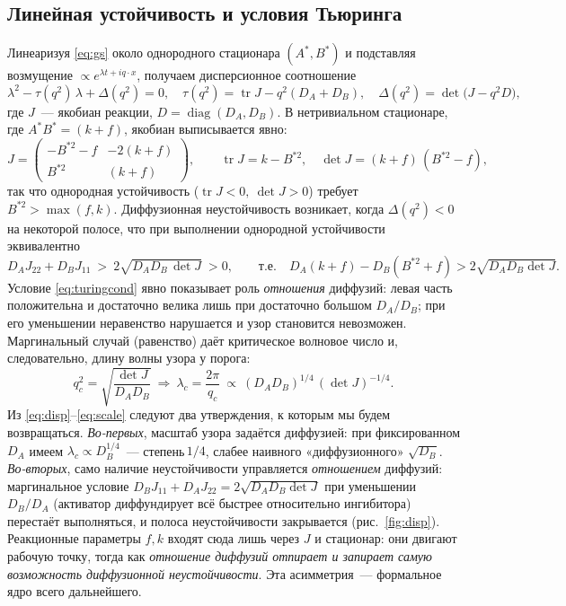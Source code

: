 \documentclass[11pt]{article}
\newcommand{\DA}{D_{\!A}}\newcommand{\DB}{D_{\!B}}
\begin{document}
\subsection{Линейная устойчивость и условия Тьюринга}
Линеаризуя \eqref{eq:gs} около однородного стационара $(A^*,B^*)$ и подставляя возмущение $\propto e^{\lambda t+iq\cdot x}$,
получаем дисперсионное соотношение
\begin{equation}
\lambda^2-\tau(q^2)\,\lambda+\Delta(q^2)=0,\quad
\tau(q^2)=\operatorname{tr}J-q^2(\DA+\DB),\quad
\Delta(q^2)=\det\!\big(J-q^2D\big),
\label{eq:disp}
\end{equation}
где $J$~— якобиан реакции, $D=\operatorname{diag}(\DA,\DB)$. В нетривиальном стационаре, где $A^*B^*=(k+f)$,
якобиан выписывается явно:
\begin{equation}
J=\begin{pmatrix} -B^{*2}-f & -2(k+f)\\[2pt] B^{*2} & (k+f)\end{pmatrix},\qquad
\operatorname{tr}J=k-B^{*2},\quad \det J=(k+f)\,(B^{*2}-f),
\label{eq:jac}
\end{equation}
так что однородная устойчивость ($\operatorname{tr}J<0,\ \det J>0$) требует $B^{*2}>\max(f,k)$. Диффузионная
неустойчивость возникает, когда $\Delta(q^2)<0$ на некоторой полосе, что при выполнении однородной устойчивости
эквивалентно
\begin{equation}
\DA J_{22}+\DB J_{11}\ >\ 2\sqrt{\DA\DB\,\det J}\ >0,
\qquad\text{т.е.}\quad \DA(k+f)-\DB(B^{*2}+f)>2\sqrt{\DA\DB\det J}.
\label{eq:turingcond}
\end{equation}
Условие \eqref{eq:turingcond} явно показывает роль \emph{отношения} диффузий: левая часть положительна и достаточно
велика лишь при достаточно большом $\DA/\DB$; при его уменьшении неравенство нарушается и узор становится
невозможен. Маргинальный случай (равенство) даёт критическое волновое число и, следовательно, длину волны узора у
порога:
\begin{equation}
q_c^2=\sqrt{\frac{\det J}{\DA\DB}}\ \Longrightarrow\
\lambda_c=\frac{2\pi}{q_c}\ \propto\ (\DA\DB)^{1/4}\,(\det J)^{-1/4}.
\label{eq:scale}
\end{equation}
Из \eqref{eq:disp}–\eqref{eq:scale} следуют два утверждения, к которым мы будем возвращаться. \emph{Во-первых},
масштаб узора задаётся диффузией: при фиксированном $\DA$ имеем $\lambda_c\propto\DB^{1/4}$~— степень\,\emph{\/}$1/4$,
слабее наивного «диффузионного» $\sqrt{\DB}$. \emph{Во-вторых}, само наличие неустойчивости управляется
\emph{отношением} диффузий: маргинальное условие $\DB J_{11}+\DA J_{22}=2\sqrt{\DA\DB\det J}$ при уменьшении
$\DB/\DA$ (активатор диффундирует всё быстрее относительно ингибитора) перестаёт выполняться, и полоса
неустойчивости закрывается (рис.~\ref{fig:disp}). Реакционные параметры $f,k$ входят сюда лишь через $J$ и
стационар: они двигают рабочую точку, тогда как \emph{отношение диффузий отпирает и запирает самую возможность
диффузионной неустойчивости}. Эта асимметрия~— формальное ядро всего дальнейшего.
\end{document}
